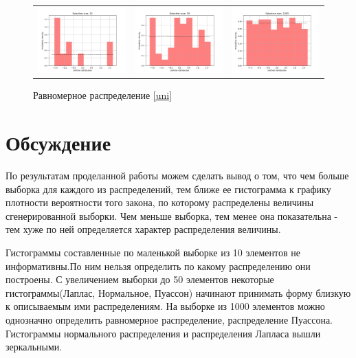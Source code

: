 \documentclass[a4paper]{article}
\begin{document}
	\begin{figure}[H]
		\centering
		\begin{tabular}{ccc}
			\includegraphics[width=55mm, height =0.25\textheight]{Uniform_10.png}
			&
			\includegraphics[width=55mm, height =0.25\textheight]{Uniform_50.png}
			&
			\includegraphics[width=55mm, height =0.25\textheight]{Uniform_1000.png}
		\end{tabular}
		\caption{Равномерное распределение \eqref{uni}}
		\label{fig:uniform}
	\end{figure}

\section{Обсуждение}

По результатам проделанной работы можем сделать вывод о том, что чем больше выборка для каждого из распределений, тем ближе ее гистограмма к графику плотности вероятности того закона, по которому распределены величины сгенерированной выборки. Чем меньше выборка, тем менее она показательна - тем хуже по ней определяется характер распределения величины.

Гистограммы составленные по маленькой выборке из 10 элементов не информативны.По ним нельзя определить по какому распределению они построены. С увеличением выборки до 50 элементов некоторые гистограммы(Лаплас, Нормальное, Пуассон) начинают принимать форму близкую к описываемым ими распределениям. На выборке из 1000 элементов можно однозначно определить равномерное распределение, распределение Пуассона. Гистограммы нормального распределения и распределения Лапласа вышли зеркальными.
\end{document}
